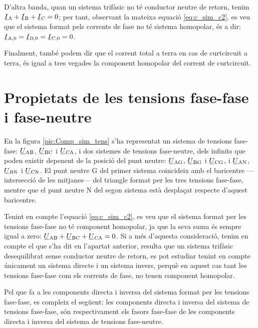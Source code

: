 D'altra banda, quan un sistema trifàsic no té conductor neutre de retorn, tenim
$\cmplx{I}\ped{A}+ \cmplx{I}\ped{B}+\cmplx{I}\ped{C}=0$; per tant,
observant la mateixa equació \eqref{eq:c_sim_c2}, es veu que el
sistema format pels corrents de fase no té sistema homopolar, és a dir: $\cmplx{I}\ped{A,0}=\cmplx{I}\ped{B,0}=\cmplx{I}\ped{C,0}=0$.

Finalment, també podem dir que el corrent total a terra en cas de
curtcircuit a terra, és igual a tres vegades la component homopolar del
corrent de curtcircuit.

\section{Propietats de les tensions fase-fase i fase-neutre}\label{sec:comp-sim-neutre}
 

En la figura \vref{pic:Comp_sim_tens} s'ha representat un sistema de
tensions fase-fase: $\cmplx{U}\ped{AB}$,
$\cmplx{U}\ped{BC}$ i $\cmplx{U}\ped{CA}$, i dos
sistemes de tensions fase-neutre, dels infinits que poden existir
depenent de la posició del punt neutre: $\cmplx{U}\ped{AG}$,
$\cmplx{U}\ped{BG}$ i $\cmplx{U}\ped{CG}$, i
$\cmplx{U}\ped{AN}$, $\cmplx{U}\ped{BN}$ i
$\cmplx{U}\ped{CN}$. El punt neutre G del primer sistema
coincideix amb el baricentre ---intersecció de les mitjanes--- del
triangle  format per les tres tensions fase-fase, mentre que el
punt neutre N del segon sistema està desplaçat respecte
d'aquest baricentre.

\begin{center}
    
    \label{pic:Comp_sim_tens}
\end{center}

Tenint en compte l'equació \eqref{eq:c_sim_c2}, es veu que el sistema
format per les tensions fase-fase no té component homopolar, ja que
la seva suma  és sempre igual a zero: $\cmplx{U}\ped{AB} +
\cmplx{U}\ped{BC} + \cmplx{U}\ped{CA} = 0$. Si a més
d'aquesta consideració, tenim en compte el que s'ha dit en l'apartat
anterior, resulta que un sistema trifàsic desequilibrat sense conductor
neutre de retorn, es pot estudiar tenint en compte únicament un sistema directe
i un sistema invers, perquè en aquest cas tant les tensions fase-fase com els
corrents de fase, no tenen component homopolar.

Pel que fa a les components directa i inversa del sistema format per
les tensions fase-fase, es compleix el següent: les components
directa i inversa del sistema de tensions fase-fase, són
respectivament els fasors fase-fase de les components directa i
inversa del sistema de tensions fase-neutre.

